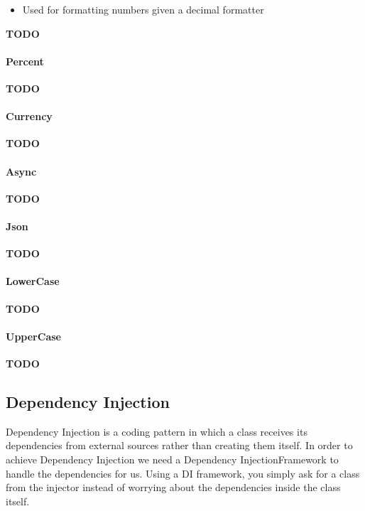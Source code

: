 \documentclass[12pt,]{article}
\providecommand{\tightlist}{%
  \setlength{\itemsep}{0pt}\setlength{\parskip}{0pt}}
\let\oldparagraph\paragraph
\renewcommand{\paragraph}[1]{\oldparagraph{#1}\mbox{}}
\begin{document}
\begin{itemize}
\tightlist
\item
  Used for formatting numbers given a decimal formatter
\end{itemize}

\textbf{TODO}

\paragraph{Percent}\label{percent}

\textbf{TODO}

\paragraph{Currency}\label{currency}

\textbf{TODO}

\paragraph{Async}\label{async}

\textbf{TODO}

\paragraph{Json}\label{json}

\textbf{TODO}

\paragraph{LowerCase}\label{lowercase}

\textbf{TODO}

\paragraph{UpperCase}\label{uppercase}

\textbf{TODO}

\subsection{Dependency Injection}\label{dependency-injection}

Dependency Injection is a coding pattern in which a class receives its
dependencies from external sources rather than creating them itself. In
order to achieve Dependency Injection we need a Dependency
InjectionFramework to handle the dependencies for us. Using a DI
framework, you simply ask for a class from the injector instead of
worrying about the dependencies inside the class itself.
\end{document}
